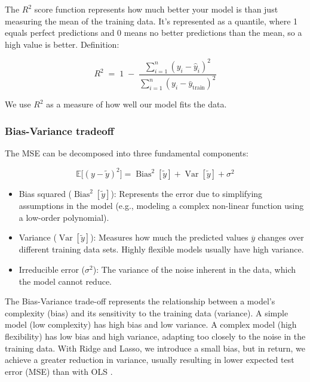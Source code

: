 \documentclass[amssymb,twocolumn,aps,floatfix]{revtex4-2}
\begin{document}
The $R^2$ score function represents how much better your model is than just measuring the mean of the training data. It's represented as a quantile, where 1 equals perfect predictions and 0 means no better predictions than the mean, so a high value is better. Definition: 

\begin{equation}
    R^2 \;=\; 1 \;-\; \frac{\sum_{i=1}^n (y_i - \hat y_i)^2}{\sum_{i=1}^n (y_i - \bar y_{\text{train}})^2}
\end{equation}

We use $R^2$ as a measure of how well our model fits the data. 

\subsubsection{Bias-Variance tradeoff}
\label{subsubsec:bias_var_theory}

The MSE can be decomposed into three fundamental components: 

\begin{equation}
    \mathbb{E}\!\big[(y-\tilde y)^2\big]
= \operatorname{Bias}^2[\tilde y]
+ \operatorname{Var}[\tilde y]
+ \sigma^2
\end{equation}

\begin{itemize}
    \item Bias squared ($\operatorname{Bias}^2[\tilde y]$): Represents the error due to simplifying assumptions in the model (e.g., modeling a complex non-linear function using a low-order polynomial). 
    \item Variance ($\operatorname{Var}[\tilde y]$): Measures how much the predicted values $\overline{y}$ changes over different training data sets. Highly flexible models usually have high variance. 
    \item Irreducible error ($\sigma^2$): The variance of the noise inherent in the data, which the model cannot reduce. 
\end{itemize}

The Bias-Variance trade-off represents the relationship between a model's complexity (bias) and its sensitivity to the training data (variance). 
A simple model (low complexity) has high bias and low variance. 
A complex model (high flexibility) has low bias and high variance, adapting too closely to the noise in the training data. With Ridge and Lasso, we introduce a small bias, but in return, we achieve a greater reduction in variance, usually resulting in lower expected test error (MSE) than with OLS \cite{compfys38}. \\
\end{document}
